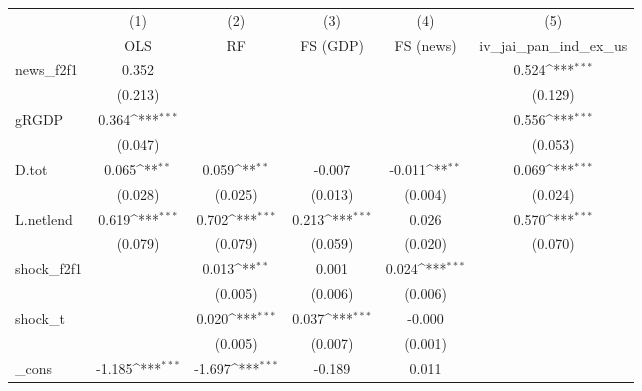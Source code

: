 {
\def\sym#1{\ifmmode^{#1}\else\(^{#1}\)\fi}
\begin{tabular}{l*{5}{c}}
\toprule
            &\multicolumn{1}{c}{(1)}&\multicolumn{1}{c}{(2)}&\multicolumn{1}{c}{(3)}&\multicolumn{1}{c}{(4)}&\multicolumn{1}{c}{(5)}\\
            &\multicolumn{1}{c}{OLS}&\multicolumn{1}{c}{RF}&\multicolumn{1}{c}{FS (GDP)}&\multicolumn{1}{c}{FS (news)}&\multicolumn{1}{c}{iv\_jai\_pan\_ind\_ex\_us}\\
\midrule
news\_f2f1   &       0.352         &                     &                     &                     &       0.524\sym{***}\\
            &     (0.213)         &                     &                     &                     &     (0.129)         \\
\addlinespace
gRGDP       &       0.364\sym{***}&                     &                     &                     &       0.556\sym{***}\\
            &     (0.047)         &                     &                     &                     &     (0.053)         \\
\addlinespace
D.tot       &       0.065\sym{**} &       0.059\sym{**} &      -0.007         &      -0.011\sym{**} &       0.069\sym{***}\\
            &     (0.028)         &     (0.025)         &     (0.013)         &     (0.004)         &     (0.024)         \\
\addlinespace
L.netlend   &       0.619\sym{***}&       0.702\sym{***}&       0.213\sym{***}&       0.026         &       0.570\sym{***}\\
            &     (0.079)         &     (0.079)         &     (0.059)         &     (0.020)         &     (0.070)         \\
\addlinespace
shock\_f2f1  &                     &       0.013\sym{**} &       0.001         &       0.024\sym{***}&                     \\
            &                     &     (0.005)         &     (0.006)         &     (0.006)         &                     \\
\addlinespace
shock\_t     &                     &       0.020\sym{***}&       0.037\sym{***}&      -0.000         &                     \\
            &                     &     (0.005)         &     (0.007)         &     (0.001)         &                     \\
\addlinespace
\_cons      &      -1.185\sym{***}&      -1.697\sym{***}&      -0.189         &       0.011         &                     \\

\end{tabular}}
